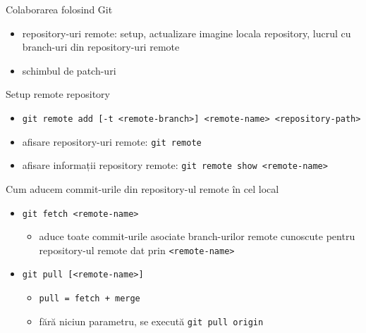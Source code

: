 \documentclass{beamer}
\begin{document}
\begin{frame}{Colaborarea folosind Git}
\begin{itemize} %
\item repository-uri remote: setup, actualizare imagine locala repository, lucrul cu branch-uri din repository-uri remote
\item schimbul de patch-uri
\end{itemize}
\end{frame}

\begin{frame}{Setup remote repository}
\begin{itemize} %
\item \texttt{git remote add [-t <remote-branch>] <remote-name> <repository-path>}
\\
\pause\item afisare repository-uri remote: \texttt{git remote}
\item afisare informații repository remote: \texttt{git remote show <remote-name>}
\end{itemize}
\end{frame}

\begin{frame}{Cum aducem commit-urile din repository-ul remote în cel local}
\begin{itemize} %
\item \texttt{git fetch <remote-name>}
\begin{itemize} %
	\item aduce toate commit-urile asociate branch-urilor remote cunoscute pentru repository-ul remote dat prin \texttt{<remote-name>}
\end{itemize}
\pause \item \texttt{git pull [<remote-name>]}
\begin{itemize} %
	\item \texttt{pull = fetch + merge}
	\item fără niciun parametru, se execută \texttt{git pull origin}
\end{itemize}

\end{itemize}
\end{frame}
\end{document}
